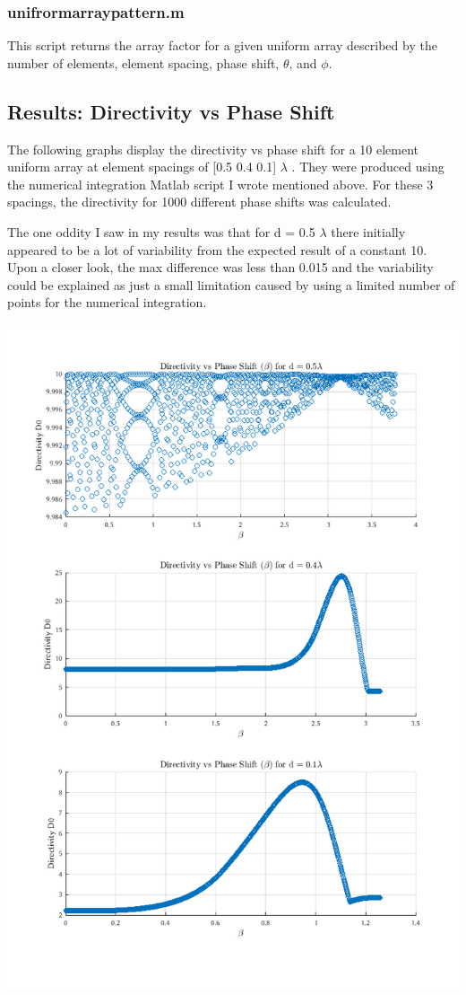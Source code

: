 \subsubsection{unifrormarraypattern.m}
This script returns the array factor for a given uniform array described by the number of elements, element spacing, phase shift, $\theta$, and $\phi$.

\subsection{Results: Directivity vs Phase Shift}
The following graphs display the directivity vs phase shift for a 10 element uniform array at element spacings of [0.5 0.4 0.1] $\lambda$ .
They were produced using the numerical integration Matlab script I wrote mentioned above. For these 3 spacings, the directivity for 1000 different phase shifts was calculated.

The one oddity I saw in my results was that for d = 0.5 $\lambda$ there initially appeared to be a lot of variability from the expected result of a constant 10. Upon a closer look, the max difference was less than 0.015 and the variability could be explained as just a small limitation caused by using a limited number of points for the numerical integration.

\includegraphics[scale=.7]{homework4_3graphs.png}

